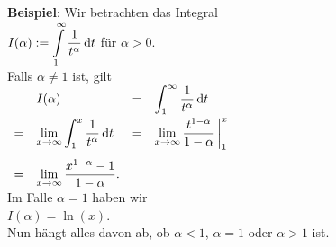 \noindent
\textbf{Beispiel}: Wir betrachten das Integral 
\\[0.2cm]
\hspace*{1.3cm}
$\displaystyle I(\alpha) := \int\limits_{1}^\infty \frac{1}{t^\alpha}\, \textrm{d} t$ \quad f\"ur $\alpha > 0$.
\\[0.2cm]
Falls $\alpha \not= 1$ ist,  gilt 
\\[0.2cm]
\hspace*{1.3cm}
$
\begin{array}[t]{clcl}  
  &I(\alpha) & = & \displaystyle \int_{1}^\infty \frac{1}{t^\alpha}\, \textrm{d} t  \\[0.3cm]
= & \displaystyle \lim\limits_{x \rightarrow \infty} \int_1^x \frac{1}{t^\alpha}\, \textrm{d} t 
& = & \displaystyle \lim\limits_{x \rightarrow \infty} \frac{t^{1-\alpha}}{1-\alpha} \,\bigg|_1^x \\[0.5cm]
= & \displaystyle \lim\limits_{x \rightarrow \infty} \frac{x^{1-\alpha}-1}{1-\alpha}.
\end{array}
$
\\[0.3cm]
Im Falle $\alpha = 1$ haben wir
\\[0.2cm]
\hspace*{1.3cm}
$I(\alpha) = \ln(x)$.
\\[0.2cm]
Nun h\"angt alles davon ab, ob $\alpha < 1$, $\alpha = 1$ oder 
 $\alpha > 1$ ist.

